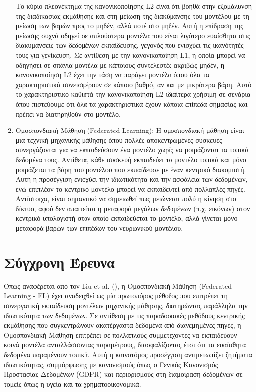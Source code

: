 \begin{enumerate}
    Το κύριο πλεονέκτημα της κανονικοποίησης L2 είναι ότι βοηθά στην εξομάλυνση της διαδικασίας εκμάθησης και στη μείωση της διακύμανσης του μοντέλου με τη μείωση των βαρών προς το μηδέν, αλλά ποτέ στο μηδέν. Αυτή η επίδραση της μείωσης συχνά οδηγεί σε απλούστερα μοντέλα που είναι λιγότερο ευαίσθητα στις διακυμάνσεις των δεδομένων εκπαίδευσης, γεγονός που ενισχύει τις ικανότητές τους για γενίκευση. Σε αντίθεση με την κανονικοποίηση L1, η οποία μπορεί να οδηγήσει σε σπάνια μοντέλα με κάποιους συντελεστές ακριβώς μηδέν, η κανονικοποίηση L2 έχει την τάση να παράγει μοντέλα όπου όλα τα χαρακτηριστικά συνεισφέρουν σε κάποιο βαθμό, αν και με μικρότερα βάρη. Αυτό το χαρακτηριστικό καθιστά την κανονικοποίηση L2 ιδιαίτερα χρήσιμη σε σενάρια όπου πιστεύουμε ότι όλα τα χαρακτηριστικά έχουν κάποια επίπεδα σημασίας και πρέπει να διατηρηθούν στο μοντέλο.

    \item Ομοσπονδιακή Μάθηση (Federated Learning): Η ομοσπονδιακή μάθηση είναι μια τεχνική μηχανικής μάθησης όπου πολλές αποκεντρωμένες συσκευές συνεργάζονται για να εκπαιδεύσουν ένα μοντέλο χωρίς να μοιράζονται τα τοπικά δεδομένα τους. Αντίθετα, κάθε συσκευή εκπαιδεύει το μοντέλο τοπικά και μόνο μοιράζεται τα βάρη του μοντέλου που εκπαίδευσε με έναν κεντρικό διακομιστή. Αυτή η προσέγγιση ενισχύει την ιδιωτικότητα και την ασφάλεια των δεδομένων, ενώ επιπλέον το κεντρικό μοντέλο μπορεί να εκπαιδευτεί από πολλαπλές πηγές. Αντίστοιχα, είναι σημαντικό να σημειωθεί πως μειώνεται πολύ η κίνηση στο δίκτυο, αφού δεν απαιτείται η μεταφορά μεγάλων δεδομένων (π.χ. εικόνων) στον κεντρικό υπολογιστή στον οποίο εκπαιδεύεται το μοντέλο, αλλά γίνεται μόνο μεταφορά βαρών των επιπέδων του νευρωνικού μοντέλου. 

\end{enumerate}

\section{Σύγχρονη Έρευνα}

Όπως αναφέρεται από τον Liu et al. (\cite{liu2024recent}), η Ομοσπονδιακή Μάθηση (Federated Learning - FL) έχει αναδειχθεί ως μία πρωτοπόρος μέθοδος που επιτρέπει τη συνεργατική εκπαίδευση μοντέλων μηχανικής μάθησης, διατηρώντας παράλληλα την ιδιωτικότητα των δεδομένων. Σε αντίθεση με τις παραδοσιακές μεθόδους κεντρικής εκμάθησης που συγκεντρώνουν ακατέργαστα δεδομένα από διανεμημένες πηγές, η Ομοσπονδιακή Μάθηση επιτρέπει σε πολλαπλούς συμμετέχοντες να εκπαιδεύουν κοινά μοντέλα ανταλλάσσοντας παραμέτρους, διασφαλίζοντας έτσι ότι τα ευαίσθητα δεδομένα παραμένουν τοπικά. Αυτή η καινοτόμος προσέγγιση αντιμετωπίζει ζητήματα ιδιωτικότητας, συμμόρφωσης με κανονισμούς όπως ο Γενικός Κανονισμός Προστασίας Δεδομένων (GDPR) και περιορισμούς στη διαμοίραση δεδομένων σε τομείς όπως η υγεία και τα χρηματοοικονομικά.

